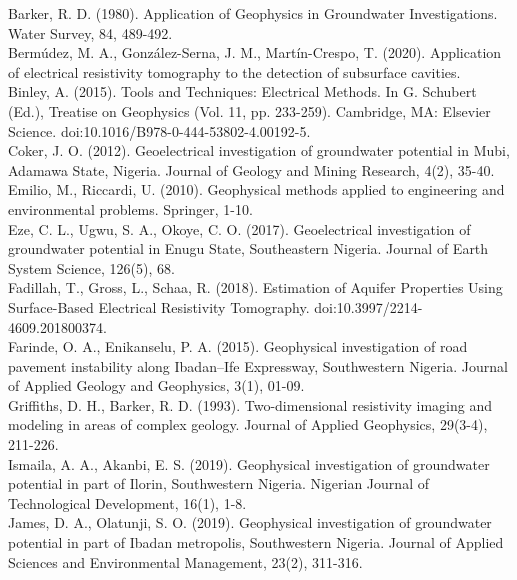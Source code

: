 \documentclass[12pt,a4paper]{report}
\begin{document}
\begin{justify}
    Barker, R. D. (1980). Application of Geophysics in Groundwater Investigations. Water Survey, 84, 489-492. \\
    
    Bermúdez, M. A., González-Serna, J. M., Martín-Crespo, T. (2020). Application of electrical resistivity tomography to the detection of subsurface cavities. \\
    
    Binley, A. (2015). Tools and Techniques: Electrical Methods. In G. Schubert (Ed.), Treatise on Geophysics (Vol. 11, pp. 233-259). Cambridge, MA: Elsevier Science. doi:10.1016/B978-0-444-53802-4.00192-5. \\
    
    Coker, J. O. (2012). Geoelectrical investigation of groundwater potential in Mubi, Adamawa State, Nigeria. Journal of Geology and Mining Research, 4(2), 35-40. \\
    
    Emilio, M., Riccardi, U. (2010). Geophysical methods applied to engineering and environmental problems. Springer, 1-10. \\
    
    Eze, C. L., Ugwu, S. A., Okoye, C. O. (2017). Geoelectrical investigation of groundwater potential in Enugu State, Southeastern Nigeria. Journal of Earth System Science, 126(5), 68. \\
    
    Fadillah, T., Gross, L., Schaa, R. (2018). Estimation of Aquifer Properties Using Surface-Based Electrical Resistivity Tomography. doi:10.3997/2214-4609.201800374. \\
    
    Farinde, O. A., Enikanselu, P. A. (2015). Geophysical investigation of road pavement instability along Ibadan–Ife Expressway, Southwestern Nigeria. Journal of Applied Geology and Geophysics, 3(1), 01-09. \\
    
    Griffiths, D. H., Barker, R. D. (1993). Two-dimensional resistivity imaging and modeling in areas of complex geology. Journal of Applied Geophysics, 29(3-4), 211-226. \\
    
    Ismaila, A. A., Akanbi, E. S. (2019). Geophysical investigation of groundwater potential in part of Ilorin, Southwestern Nigeria. Nigerian Journal of Technological Development, 16(1), 1-8. \\
    
    James, D. A., Olatunji, S. O. (2019). Geophysical investigation of groundwater potential in part of Ibadan metropolis, Southwestern Nigeria. Journal of Applied Sciences and Environmental Management, 23(2), 311-316. \\
    

\end{justify}
\end{document}
